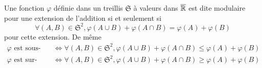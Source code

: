 \begin{defi}
  Une fonction $\varphi$ définie dans un treillis $\mathfrak{S}$ à valeurs dans $\overline{\mathbb{R}}$ est dite modulaire pour une extension de l'addition si et seulement si
\begin{displaymath}
  \forall (A,B) \in \mathfrak{S}^2, \varphi(A \cup B) + \varphi(A \cap B) = \varphi(A) + \varphi(B)
\end{displaymath}
pour cette extension. De même
\begin{align*}
  \varphi \text{ est sous-modulaire } &\Leftrightarrow \forall (A,B) \in \mathfrak{S}^2, \varphi(A \cup B) + \varphi(A \cap B) \leq \varphi(A) + \varphi(B) \\
  \varphi \text{ est sur-modulaire } &\Leftrightarrow \forall (A,B) \in \mathfrak{S}^2, \varphi(A \cup B) + \varphi(A \cap B) \geq \varphi(A) + \varphi(B)
\end{align*}
\end{defi}

